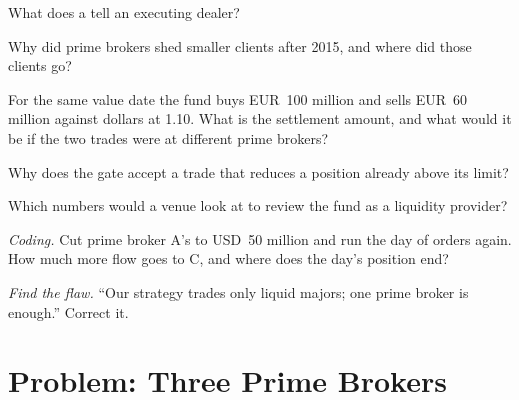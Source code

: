 \begin{exercise}[$\star$]\label{exo:m2:getting-access-fx:2}
What does a  tell an executing dealer?
\end{exercise}

\begin{exercise}[$\star$]\label{exo:m2:getting-access-fx:3}
Why did prime brokers shed smaller clients after 2015, and where did those clients go?
\end{exercise}

\begin{exercise}[$\star\star$]\label{exo:m2:getting-access-fx:4}
For the same value date the fund buys EUR~100 million and sells EUR~60 million against
dollars at 1.10. What is the settlement amount, and what would it be if the two trades
were at different prime brokers?
\end{exercise}

\begin{exercise}[$\star\star$]\label{exo:m2:getting-access-fx:5}
Why does the gate accept a trade that reduces a position already above its limit?
\end{exercise}

\begin{exercise}[$\star\star$]\label{exo:m2:getting-access-fx:6}
Which numbers would a venue look at to review the fund as a liquidity provider?
\end{exercise}

\begin{exercise}[$\star\star\star$]\label{exo:m2:getting-access-fx:7}
\emph{Coding.} Cut prime broker A's  to USD~50 million and run the
day of orders again. How much more flow goes to C, and where does the day's position
end?
\end{exercise}

\begin{exercise}[$\star\star\star$]\label{exo:m2:getting-access-fx:8}
\emph{Find the flaw.} ``Our strategy trades only liquid majors; one prime broker is
enough.'' Correct it.
\end{exercise}

\section{Problem: Three Prime Brokers}

